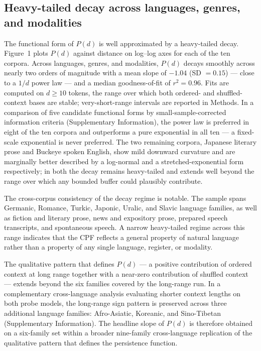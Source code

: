 \documentclass[11pt]{article}
\begin{document}
\subsection{Heavy-tailed decay across languages, genres, and modalities}

The functional form of $P(d)$ is well approximated by a heavy-tailed decay. Figure~1
plots $P(d)$ against distance on log--log axes for each of the ten corpora. Across
languages, genres, and modalities, $P(d)$ decays smoothly across nearly two orders of
magnitude with a mean slope of $-1.04$ (SD $=0.15$) --- close to a $1/d$ power law
--- and a median goodness-of-fit of $r^2 = 0.96$. Fits are computed on $d \geq 10$
tokens, the range over which both ordered- and shuffled-context bases are stable;
very-short-range intervals are reported in Methods. In a comparison of five candidate
functional forms by small-sample-corrected information criteria (Supplementary
Information), the power law is preferred in eight of the ten corpora and outperforms a
pure exponential in all ten --- a fixed-scale exponential is never preferred. The two
remaining corpora, Japanese literary prose and Buckeye spoken English, show mild downward
curvature and are marginally better described by a log-normal and a stretched-exponential
form respectively; in both the decay remains heavy-tailed and extends well beyond the range
over which any bounded buffer could plausibly contribute.

The cross-corpus consistency of the decay regime is notable. The sample spans
Germanic, Romance, Turkic, Japonic, Uralic, and Slavic language families, as well as
fiction and literary prose, news and expository prose, prepared speech transcripts,
and spontaneous speech. A narrow heavy-tailed regime across this range indicates that
the CPF reflects a general property of natural language rather than a
property of any single language, register, or modality.

The qualitative pattern that defines $P(d)$ --- a positive contribution of ordered
context at long range together with a near-zero contribution of shuffled context ---
extends beyond the six families covered by the long-range run. In a complementary
cross-language analysis evaluating shorter context lengths on both probe models, the
long-range sign pattern is preserved across three additional language families:
Afro-Asiatic, Koreanic, and Sino-Tibetan (Supplementary Information). The headline
slope of $P(d)$ is therefore obtained on a six-family set within a broader nine-family
cross-language replication of the qualitative pattern that defines the persistence
function.
\end{document}
